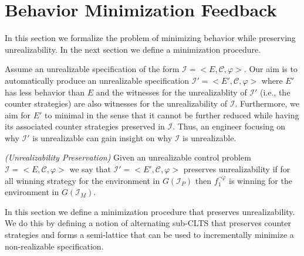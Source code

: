 \section{Behavior Minimization Feedback}\label{sec:problemStatement}

In this section we formalize the problem of minimizing behavior while preserving unrealizability. In the next section we define a minimization procedure.

Assume an unrealizable specification of the form $\mathcal{I} = <E, \mathcal{C}, \varphi>$. Our aim is to automatically produce an unrealizable specification $\mathcal{I'} = <E', \mathcal{C}, \varphi>$ where $E'$ has less behavior than $E$ and the witnesses for the unrealizablity of $\mathcal{I'}$ (i.e., the counter strategies) are also witnesses for the unrealizability of $\mathcal{I}$.  Furthermore, we aim for $E'$ to minimal in the sense that it cannot be further reduced while having its associated counter strategies preserved in  $\mathcal{I}$.
Thus, an engineer focusing on why  $\mathcal{I'}$ is unrealizable can gain insight on why $\mathcal{I}$ is unrealizable. 


\begin{definition}\label{}\emph{(Unrealizability Preservation)}
Given an unrealizable control problem $\mathcal{I} = <E, \mathcal{C}, \varphi>$ we say
that $\mathcal{I'} = <E', \mathcal{C}, \varphi>$ preserves unrealizability
 if for all  winning strategy \counterS for
the environment in $G(\mathcal{I}_P)$ 
then $f_1^{\neg \varphi}$ is winning for the environment in
$G(\mathcal{I}_M)$.
\end{definition}


In this section we define a minimization procedure that preserves unrealizability. We do this by defining a notion of alternating sub-CLTS that preserves counter strategies and forms a semi-lattice that can be used to incrementally minimize a non-realizable specification. 

%


